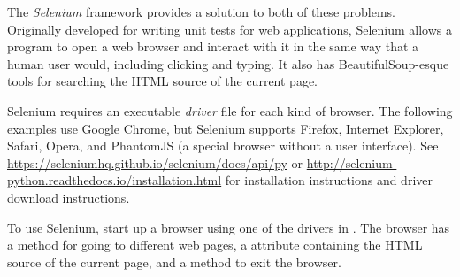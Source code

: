 \begin{comment} %
Navigate to the website \url{http://www.simplesoccerstats.com/stats/teamstats.php?lge=14&type=goals&season=0}.
Notice that there is a row for the Chicago team displayed in the browser.
Open up the page source,
Hit \li{ctrl+f} and search for ``Chicago''.
Notice that it isn't there.
The following code will produce a similar result:

\begin{lstlisting}
>>> soccer_url = 'http://www.simplesoccerstats.com/stats/teamstats.php?lge=14&type=goals&season=0'
>>> soccer_content = requests.get(soccer_url).text
>>> soccer_soup = BeautifulSoup(soccer_content)

>>> print(soccer_soup.find(string='Chicago'))
<<None>>
\end{lstlisting}
Still nothing.
This means the actual table of information is loaded asynchronously.
\end{comment}

The \emph{Selenium} framework provides a solution to both of these problems.
Originally developed for writing unit tests for web applications, Selenium allows a program to open a web browser and interact with it in the same way that a human user would, including clicking and typing.
It also has BeautifulSoup-esque tools for searching the HTML source of the current page.


\begin{info} %
Selenium requires an executable \emph{driver} file for each kind of browser.
The following examples use Google Chrome, but Selenium supports Firefox, Internet Explorer, Safari, Opera, and PhantomJS (a special browser without a user interface).
See \url{https://seleniumhq.github.io/selenium/docs/api/py} or \url{http://selenium-python.readthedocs.io/installation.html} for installation instructions and driver download instructions.
\end{info}

To use Selenium, start up a browser using one of the drivers in .
The browser has a  method for going to different web pages, a  attribute containing the HTML source of the current page, and a  method to exit the browser.

